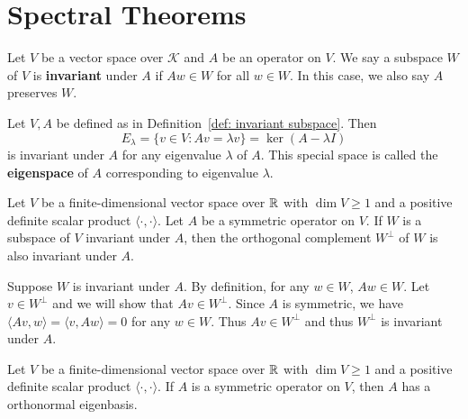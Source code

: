     \section{Spectral Theorems}
    \begin{definitionenv}\label{def: invariant subspace}
        Let $V$ be a vector space over $\mathcal{K}$ and $A$ be an operator on $V$. We say a subspace $W$ of $V$ is \textbf{invariant} under $A$ if $A w \in W$ for all $w\in W$. In this case, we also say $A$ preserves $W$.
    \end{definitionenv}
    \begin{exampleenv}
        Let $V,A$ be defined as in Definition~\ref{def: invariant subspace}. Then
        $$ E_\lambda = \{v\in V: Av = \lambda v\} = \ker(A-\lambda I) $$
        is invariant under $A$ for any eigenvalue $\lambda$ of $A$. This special space is called the \textbf{eigenspace} of $A$ corresponding to eigenvalue $\lambda$.
    \end{exampleenv}
    \begin{lemmaenv}
        Let $V$ be a finite-dimensional vector space over $\mathbb{R}$ with $\dim V\ge 1$ and a positive definite scalar product $\langle \cdot, \cdot \rangle$. Let $A$ be a symmetric operator on $V$. If $W$ is a subspace of $V$ invariant under $A$, then the orthogonal complement $W^\perp$ of $W$ is also invariant under $A$.
    \end{lemmaenv}
    \begin{proofenv}
        Suppose $W$ is invariant under $A$. By definition, for any $w\in W$, $Aw\in W$. Let $v\in W^\perp$ and we will show that $Av \in W^\perp$. Since $A$ is symmetric, we have $\langle Av, w \rangle = \langle v, A w \rangle = 0 $ for any $w\in W$. Thus $Av \in W^\perp$ and thus $W^\perp$ is invariant under $A$.
    \end{proofenv}
    \begin{theoremenv}\label{thm: real version of spectral theorem}
        Let $V$ be a finite-dimensional vector space over $\mathbb{R}$ with $\dim V\ge 1$ and a positive definite scalar product $\langle \cdot, \cdot \rangle$. If $A$ is a symmetric operator on $V$, then $A$ has a orthonormal eigenbasis.
    \end{theoremenv}
